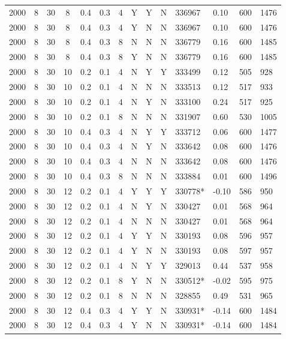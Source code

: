 \documentclass[a4paper, twocolumn, oneside, 10pt]{article}
\begin{document}
\begin{longtable}{|ccccccccccllll|}
	2000 & 8 & 30 & 8 & 0.4 & 0.3 & 4 & Y & Y & N & 336967 & 0.10 & 600 & 1476\\
	2000 & 8 & 30 & 8 & 0.4 & 0.3 & 4 & Y & N & N & 336967 & 0.10 & 600 & 1476\\
	2000 & 8 & 30 & 8 & 0.4 & 0.3 & 8 & N & N & N & 336779 & 0.16 & 600 & 1485\\
	2000 & 8 & 30 & 8 & 0.4 & 0.3 & 8 & Y & N & N & 336779 & 0.16 & 600 & 1485\\
	2000 & 8 & 30 & 10 & 0.2 & 0.1 & 4 & N & Y & Y & 333499 & 0.12 & 505 & 928\\
	2000 & 8 & 30 & 10 & 0.2 & 0.1 & 4 & N & N & N & 333513 & 0.12 & 517 & 933\\
	2000 & 8 & 30 & 10 & 0.2 & 0.1 & 4 & N & Y & N & 333100 & 0.24 & 517 & 925\\
	2000 & 8 & 30 & 10 & 0.2 & 0.1 & 8 & N & N & N & 331907 & 0.60 & 530 & 1005\\
	2000 & 8 & 30 & 10 & 0.4 & 0.3 & 4 & N & Y & Y & 333712 & 0.06 & 600 & 1477\\
	2000 & 8 & 30 & 10 & 0.4 & 0.3 & 4 & N & Y & N & 333642 & 0.08 & 600 & 1476\\
	2000 & 8 & 30 & 10 & 0.4 & 0.3 & 4 & N & N & N & 333642 & 0.08 & 600 & 1476\\
	2000 & 8 & 30 & 10 & 0.4 & 0.3 & 8 & N & N & N & 333884 & 0.01 & 600 & 1496\\
	2000 & 8 & 30 & 12 & 0.2 & 0.1 & 4 & Y & Y & Y & 330778* & -0.10 & 586 & 950\\
	2000 & 8 & 30 & 12 & 0.2 & 0.1 & 4 & N & Y & N & 330427 & 0.01 & 568 & 964\\
	2000 & 8 & 30 & 12 & 0.2 & 0.1 & 4 & N & N & N & 330427 & 0.01 & 568 & 964\\
	2000 & 8 & 30 & 12 & 0.2 & 0.1 & 4 & Y & Y & N & 330193 & 0.08 & 596 & 957\\
	2000 & 8 & 30 & 12 & 0.2 & 0.1 & 4 & Y & N & N & 330193 & 0.08 & 597 & 957\\
	2000 & 8 & 30 & 12 & 0.2 & 0.1 & 4 & N & Y & Y & 329013 & 0.44 & 537 & 958\\
	2000 & 8 & 30 & 12 & 0.2 & 0.1 & 8 & Y & N & N & 330512* & -0.02 & 595 & 975\\
	2000 & 8 & 30 & 12 & 0.2 & 0.1 & 8 & N & N & N & 328855 & 0.49 & 531 & 965\\
	2000 & 8 & 30 & 12 & 0.4 & 0.3 & 4 & Y & Y & N & 330931* & -0.14 & 600 & 1484\\
	2000 & 8 & 30 & 12 & 0.4 & 0.3 & 4 & Y & N & N & 330931* & -0.14 & 600 & 1484\\

\end{longtable}
\end{document}
